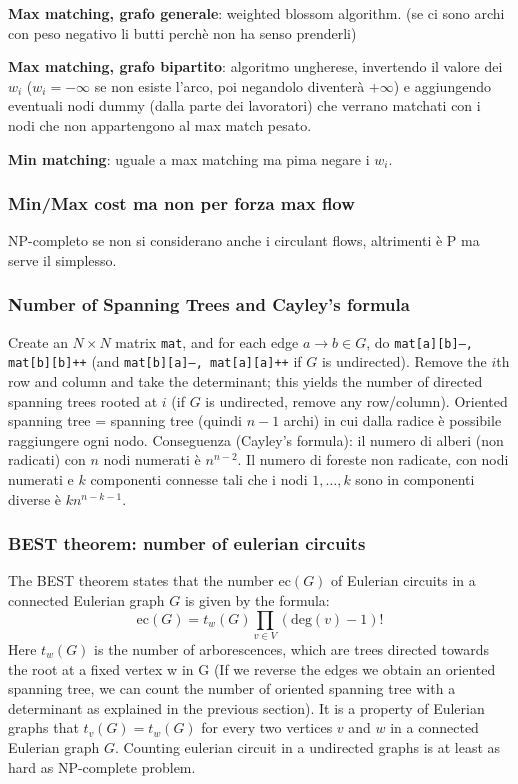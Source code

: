 \textbf{Max matching, grafo generale}: weighted blossom algorithm. (se ci sono archi con peso negativo li butti perchè non ha senso prenderli)

\textbf{Max matching, grafo bipartito}: algoritmo ungherese, invertendo il valore dei $w_i$ ($w_i=-\infty$ se non esiste l'arco, poi negandolo diventerà $+\infty$) e aggiungendo eventuali nodi dummy (dalla parte dei lavoratori) che verrano matchati con i nodi che non appartengono al max match pesato.

\textbf{Min matching}: uguale a max matching ma pima negare i $w_i$.


\subsubsection{Min/Max cost ma non per forza max flow}
NP-completo se non si considerano anche i circulant flows, altrimenti è P ma serve il simplesso.

\subsubsection{Number of Spanning Trees and Cayley's formula}
		Create an $N\times N$ matrix \texttt{mat}, and for each edge $a \rightarrow b \in G$, do
		\texttt{mat[a][b]--, mat[b][b]++} (and \texttt{mat[b][a]--, mat[a][a]++} if $G$ is undirected).
		Remove the $i$th row and column and take the determinant; this yields the number of directed spanning trees rooted at $i$
		(if $G$ is undirected, remove any row/column). Oriented spanning tree = spanning tree (quindi $n-1$ archi) in cui dalla radice è possibile raggiungere ogni nodo. Conseguenza (Cayley's formula): il numero di alberi (non radicati) con $n$ nodi numerati è $n^{n-2}$. Il numero di foreste non radicate, con nodi numerati e $k$ componenti connesse tali che i nodi $1,\dots,k$ sono in componenti diverse è $kn^{n-k-1}$.

\subsubsection{BEST theorem: number of eulerian circuits}
The BEST theorem states that the number ec$(G)$ of Eulerian circuits in a connected Eulerian graph $G$ is given by the formula:
$$\text{ec}(G)=t_w(G)\prod_{v\in V}(\text{deg}(v)-1)!$$
Here $t_w(G)$ is the number of arborescences, which are trees directed towards the root at a fixed vertex w in G (If we reverse the edges we obtain an oriented spanning tree, we can count the number of oriented spanning tree with a determinant as explained in the previous section).
It is a property of Eulerian graphs that $t_v(G) = t_w(G)$ for every two vertices $v$ and $w$ in a connected Eulerian graph $G$. Counting eulerian circuit in a undirected graphs is at least as hard as NP-complete problem.
